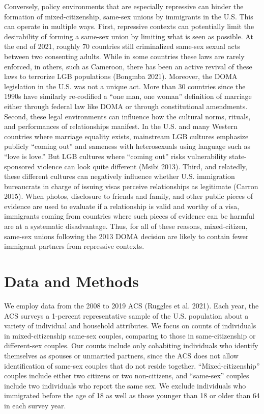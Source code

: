 \documentclass[
  12pt,
]{article}
\begin{document}
Conversely, policy environments that are especially repressive can hinder the formation of mixed-citizenship, same-sex unions by immigrants in the U.S. This can operate in multiple ways. First, repressive contexts can potentially limit the desirability of forming a same-sex union by limiting what is seen as possible. At the end of 2021, roughly 70 countries still criminalized same-sex sexual acts between two consenting adults. While in some countries these laws are rarely enforced, in others, such as Cameroon, there has been an active revival of these laws to terrorize LGB populations (Bongmba 2021). Moreover, the DOMA legislation in the U.S. was not a unique act. More than 30 countries since the 1990s have similarly re-codified a ``one man, one woman'' definition of marriage either through federal law like DOMA or through constitutional amendments. Second, these legal environments can influence how the cultural norms, rituals, and performances of relationships manifest. In the U.S. and many Western countries where marriage equality exists, mainstream LGB cultures emphasize publicly ``coming out'' and sameness with heterosexuals using language such as ``love is love.'' But LGB cultures where ``coming out'' risks vulnerability state-sponsored violence can look quite different (Msibi 2013). Third, and relatedly, these different cultures can negatively influence whether U.S. immigration bureaucrats in charge of issuing visas perceive relationships as legitimate (Carron 2015). When photos, disclosure to friends and family, and other public pieces of evidence are used to evaluate if a relationship is valid and worthy of a visa, immigrants coming from countries where such pieces of evidence can be harmful are at a systematic disadvantage. Thus, for all of these reasons, mixed-citizen, same-sex unions following the 2013 DOMA decision are likely to contain fewer immigrant partners from repressive contexts.

\hypertarget{data-and-methods}{%
\section{Data and Methods}\label{data-and-methods}}

We employ data from the 2008 to 2019 ACS (Ruggles et al. 2021). Each year, the ACS surveys a 1-percent representative sample of the U.S. population about a variety of individual and household attributes. We focus on counts of individuals in mixed-citizenship same-sex couples, comparing to those in same-citizenship or different-sex couples. Our counts include only cohabiting individuals who identify themselves as spouses or unmarried partners, since the ACS does not allow identification of same-sex couples that do not reside together. ``Mixed-citizenship'' couples include either two citizens or two non-citizens, and ``same-sex'' couples include two individuals who report the same sex. We exclude individuals who immigrated before the age of 18 as well as those younger than 18 or older than 64 in each survey year.
\end{document}
